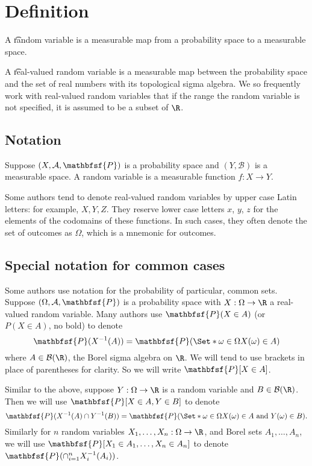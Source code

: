
\section*{Definition}

A \t{random variable} is a measurable map from a probability space to a measurable space.

A \t{real-valued random variable} is a measurable map between the probability space and the set of real numbers with its topological sigma algebra.
We so frequently work with real-valued random variables that if the range the random variable is not specified, it is assumed to be a subset of $\R $.

\subsection*{Notation}

Suppose $(X, \mathcal{A} , \mathbfsf{P} )$ is a probability space and $(Y, \mathcal{B} )$ is a measurable space.
A random variable is a measurable function $f: X \to Y$.

Some authors tend to denote real-valued random variables by upper case Latin letters: for example, $X, Y, Z$.
They reserve lower case letters $x$, $y$, $z$ for the elements of the codomains of these functions.
In such cases, they often denote the set of outcomes as $\Omega $, which is a mnemonic for outcomes.

\subsection*{Special notation for common cases}

Some authors use notation for the probability of particular, common sets.
Suppose $(\Omega , \mathcal{A} , \mathbfsf{P} )$ is a probability space with $X: \Omega  \to \R $ a real-valued random variable.
Many authors use $\mathbfsf{P} (X \in A)$ (or $P(X \in A)$, no bold) to denote
\[
\mathbfsf{P} (X^{-1}(A)) = \mathbfsf{P} (\Set*{\omega  \in \Omega }{X(\omega ) \in A})
\]
where $A \in \mathcal{B} (\R )$, the Borel sigma algebra on $\R $.
We will tend to use brackets in place of parentheses for clarity.
So we will write $\mathbfsf{P} [ X \in A ]$.

Similar to the above, suppose $Y: \Omega  \to \R $ is a random variable and $B \in \mathcal{B} (\R )$.
Then we will use $\mathbfsf{P} [X \in A, Y \in B]$ to denote
\[
\mathbfsf{P} (X^{-1}(A) \cap  Y^{-1}(B)) = \mathbfsf{P} (\Set*{\omega  \in \Omega }{X(\omega ) \in A \text{ and } Y(\omega ) \in B}).
\]
Similarly for $n$ random variables $X_1, \dots , X_n: \Omega \to \R $, and Borel sets $A_1, \dots , A_n$, we will use $\mathbfsf{P} [X_1 \in A_1, \dots , X_n \in A_n]$ to denote $\mathbfsf{P} (\cap _{i = 1}^{n} X_i^{-1}(A_i))$.

\blankpage